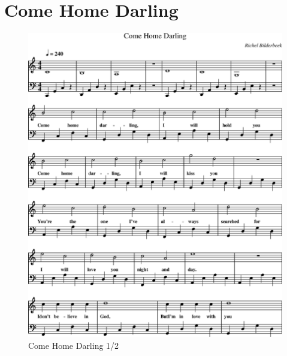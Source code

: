 \section{Come Home Darling}



\begin{figure}[!htbp]
  \includegraphics[width=\textwidth,height=\textheight,keepaspectratio]{../songs/14_come_home_darling-0.png}
  \caption{Come Home Darling 1/2}
  \label{fig:14_come_home_darling_1}
\end{figure}

